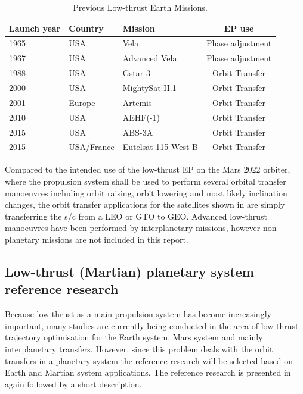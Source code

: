 \begin{table}[!ht]
\begin{center}
\caption{Previous Low-thrust Earth Missions.}
\label{tab:prevlowthrustmis}
\begin{tabular}{|l|l|l|c|}
\hline 
\textbf{Launch year} 		& \textbf{Country} & \textbf{Mission} & \textbf{\ac{EP} use} \\ \hline \hline
1965 & USA & Vela & Phase adjustment \\ \hline
1967 & USA & Advanced Vela & Phase adjustment \\ \hline
1988 & USA & Gstar-3 & Orbit Transfer \\ \hline
2000 & USA & MightySat II.1 & Orbit Transfer \\ \hline
2001 & Europe & Artemis & Orbit Transfer \\ \hline
2010 & USA & AEHF(-1) & Orbit Transfer \\ \hline
2015 & USA & ABS-3A & Orbit Transfer \\ \hline
2015 & USA/France & Eutelsat 115 West B  & Orbit Transfer\\ \hline
 
\end{tabular}
\end{center}
\end{table}

Compared to the intended use of the low-thrust \ac{EP} on the Mars 2022 orbiter, where the propulsion system shall be used to perform several orbital transfer manoeuvres including orbit raising, orbit lowering and most likely inclination changes, the orbit transfer applications for the satellites shown in  are simply transferring the \ac{s/c} from a \ac{LEO} or \ac{GTO} to \ac{GEO}. Advanced low-thrust manoeuvres have been performed by interplanetary missions, however non-planetary missions are not included in this report.






\subsection{Low-thrust (Martian) planetary system reference research}
\label{subsec:lowrefres}
Because low-thrust as a main propulsion system has become increasingly important, many studies are currently being conducted in the area of low-thrust trajectory optimisation for the Earth system, Mars system and mainly interplanetary transfers. However, since this problem deals with the orbit transfers in a planetary system the reference research will be selected based on Earth and Martian system applications. The reference research is presented in  again followed by a short description.  


